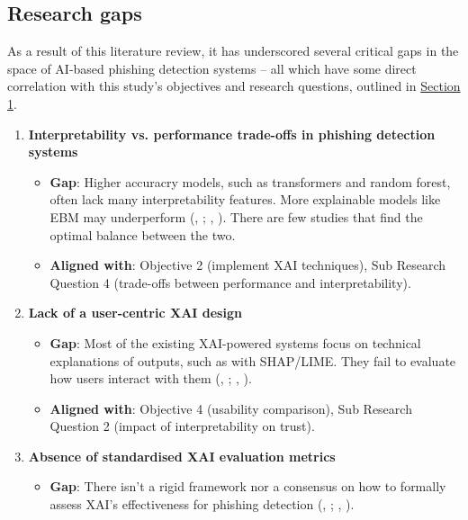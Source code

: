 \subsection*{Research gaps}

As a result of this literature review, it has underscored several critical gaps in the space of AI-based phishing detection systems -- all which have some direct correlation with this study's objectives and research questions, outlined in \hyperref[sec:1-introduction]{Section 1}.

\begin{enumerate}
  \item \textbf{Interpretability vs. performance trade-offs in phishing detection systems}
  \begin{itemize}
    \item \textbf{Gap}: Higher accuracry models, such as transformers and random forest, often lack many interpretability features. More explainable models like EBM may underperform (\citeauthor{do2024integrated}, \citeyear{do2024integrated}; \citeauthor{greco2023explaining}, \citeyear{greco2023explaining}). There are few studies that find the optimal balance between the two.
    \item \textbf{Aligned with}: Objective 2 (implement XAI techniques), Sub Research Question 4 (trade-offs between performance and interpretability).
  \end{itemize}
  \item \textbf{Lack of a user-centric XAI design}
  \begin{itemize}
    \item \textbf{Gap}: Most of the existing XAI-powered systems focus on technical explanations of outputs, such as with SHAP/LIME. They fail to evaluate how users interact with them (\citeauthor{vo2024securing}, \citeyear{vo2024securing}; \citeauthor{anderson2015polymorphic}, \citeyear{anderson2015polymorphic}).
    \item \textbf{Aligned with}: Objective 4 (usability comparison), Sub Research Question 2 (impact of interpretability on trust).
  \end{itemize}
  \item \textbf{Absence of standardised XAI evaluation metrics}  \begin{itemize}
      \item \textbf{Gap}: There isn't a rigid framework nor a consensus on how to formally assess XAI's effectiveness for phishing detection (\citeauthor{reddy2023explainable}, \citeyear{reddy2023explainable}; \citeauthor{shendkar2024enhancing}, \citeyear{shendkar2024enhancing}).

\end{itemize}
\end{enumerate}
